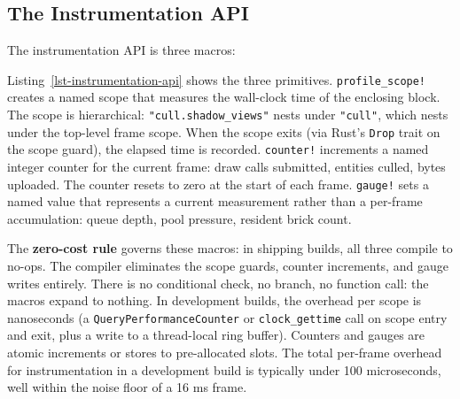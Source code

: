 \documentclass[
  11pt,
  letterpaper,
  DIV=11,
  numbers=noendperiod,
  twoside,
  open=right]{scrreprt}
\newenvironment{Shaded}{}{}
\newcommand{\CommentTok}[1]{\textcolor[rgb]{0.42,0.45,0.49}{#1}}
\newcommand{\NormalTok}[1]{\textcolor[rgb]{0.14,0.16,0.18}{#1}}
\newcommand{\OperatorTok}[1]{\textcolor[rgb]{0.14,0.16,0.18}{#1}}
\newcommand{\PreprocessorTok}[1]{\textcolor[rgb]{0.84,0.23,0.29}{#1}}
\newcommand{\StringTok}[1]{\textcolor[rgb]{0.01,0.18,0.38}{#1}}
\renewenvironment{Shaded}{\begin{snugshade}\small\setstretch{0.95}}{\end{snugshade}}
\begin{document}
\subsection{The Instrumentation API}\label{the-instrumentation-api}

The instrumentation API is three macros:

\begin{codelisting}

\caption{\label{lst-instrumentation-api}The instrumentation API: scopes,
counters, and gauges}

\centering{

\begin{Shaded}
\begin{Highlighting}[]
\PreprocessorTok{profile\_scope!}\NormalTok{(}\StringTok{"cull.shadow\_views"}\NormalTok{)}\OperatorTok{;}    \CommentTok{// scoped hierarchical timer}
\PreprocessorTok{counter!}\NormalTok{(DRAW\_CALLS}\OperatorTok{,}\NormalTok{ n)}\OperatorTok{;}                \CommentTok{// per{-}frame counter}
\PreprocessorTok{gauge!}\NormalTok{(STREAMING\_QUEUE\_DEPTH}\OperatorTok{,}\NormalTok{ depth)}\OperatorTok{;}   \CommentTok{// sampled value}
\end{Highlighting}
\end{Shaded}

}

\end{codelisting}%

Listing~\ref{lst-instrumentation-api} shows the three primitives.
\texttt{profile\_scope!} creates a named scope that measures the
wall-clock time of the enclosing block. The scope is hierarchical:
\texttt{"cull.shadow\_views"} nests under \texttt{"cull"}, which nests
under the top-level frame scope. When the scope exits (via Rust's
\texttt{Drop} trait on the scope guard), the elapsed time is recorded.
\texttt{counter!} increments a named integer counter for the current
frame: draw calls submitted, entities culled, bytes uploaded. The
counter resets to zero at the start of each frame. \texttt{gauge!} sets
a named value that represents a current measurement rather than a
per-frame accumulation: queue depth, pool pressure, resident brick
count.

The \textbf{zero-cost rule} governs these macros: in shipping builds,
all three compile to no-ops. The compiler eliminates the scope guards,
counter increments, and gauge writes entirely. There is no conditional
check, no branch, no function call: the macros expand to nothing. In
development builds, the overhead per scope is nanoseconds (a
\texttt{QueryPerformanceCounter} or \texttt{clock\_gettime} call on
scope entry and exit, plus a write to a thread-local ring buffer).
Counters and gauges are atomic increments or stores to pre-allocated
slots. The total per-frame overhead for instrumentation in a development
build is typically under 100 microseconds, well within the noise floor
of a 16 ms frame.
\end{document}

